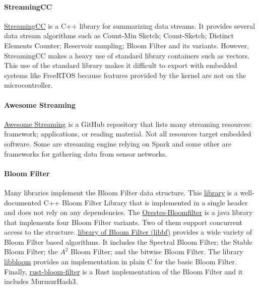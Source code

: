 \documentclass{article}
\begin{document}
\paragraph{StreamingCC}
	\href{https://github.com/jiecchen/StreamingCC}{StreamingCC} is a C++ library for summarizing data streams.
	It provides several data stream algorithms such as Count-Min Sketch;
	Count-Sketch; Distinct Elements Counter; Reservoir sampling; Bloom Filter and its variants.
	However, StreamingCC makes a heavy use of standard library containers such as vectors.
	This use of the standard library makes it difficult to export with embedded systems like
	FreeRTOS because features provided by the kernel are not on the microcontroller.

\paragraph{Awesome Streaming}
	\href{https://github.com/manuzhang/awesome-streaming}{Awesome Streaming} is a GitHub repository that lists many streaming resources:
	framework; applications, or reading material.
	Not all resources target embedded software. Some are streaming engine relying on Spark and some other are frameworks for gathering
	data from sensor networks.

\paragraph{Bloom Filter}
	Many libraries implement the Bloom Filter data structure.
	This \href{http://www.partow.net/programming/bloomfilter/index.html}{library} is a
	well-documented C++ Bloom Filter Library that is implemented in a single header
	and does not rely on any dependencies.
	The \href{https://github.com/Baqend/Orestes-Bloomfilter}{Orestes-Bloomfilter}
	is a java library that implements four Bloom Filter variants.
	Two of them support concurrent access to the structure.
	\href{http://matthias.vallentin.net/blog/2011/06/a-garden-variety-of-bloom-filters/}{library of Bloom Filter (libbf)}
	provides a wide variety of Bloom Filter based algorithms. It includes the Spectral Bloom Filter; the Stable Bloom Filter; the $A^2$ Bloom Filter; and
	the bitwise Bloom Filter.
	The library \href{https://github.com/jvirkki/libbloom}{libbloom} provides an implementation in plain C for the basic Bloom Filter.
	Finally, \href{https://github.com/brianmadden/rust-bloom-filter}{rust-bloom-filter} is a Rust implementation of the Bloom Filter
	and it includes MurmurHash3.
\end{document}
